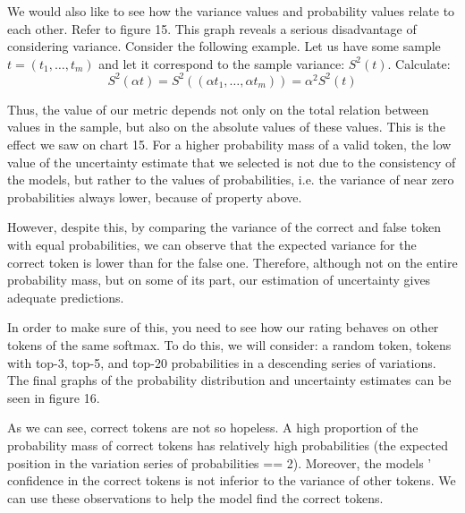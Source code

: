 \documentclass[a4paper,14pt]{extarticle}
\begin{document}
	We would also like to see how the variance values and probability values relate to each other. Refer to figure 15. This graph reveals a serious disadvantage of considering variance. Consider the following example. Let us have some sample $t = (t_1, \dots, t_m)$ and let it correspond to the sample variance: $S^2 (t)$. Calculate:
	\begin{equation*}
		S^2(\alpha t) = S^2((\alpha t_1, \dots, \alpha t_m)) = \alpha^2 S^2(t)
	\end{equation*}
	
	Thus, the value of our metric depends not only on the total relation between values in the sample, but also on the absolute values of these values. This is the effect we saw on chart 15. For a higher probability mass of a valid token, the low value of the uncertainty estimate that we selected is not due to the consistency of the models, but rather to the values of probabilities, i.e. the variance of near zero probabilities always lower, because of property above.

	However, despite this, by comparing the variance of the correct and false token with equal probabilities, we can observe that the expected variance for the correct token is lower than for the false one. Therefore, although not on the entire probability mass, but on some of its part, our estimation of uncertainty gives adequate predictions.

	In order to make sure of this, you need to see how our rating behaves on other tokens of the same softmax. To do this, we will consider: a random token, tokens with top-3, top-5, and top-20 probabilities in a descending series of variations. The final graphs of the probability distribution and uncertainty estimates can be seen in figure 16.
	
	As we can see, correct tokens are not so hopeless. A high proportion of the probability mass of correct tokens has relatively high probabilities (the expected position in the variation series of probabilities == 2). Moreover, the models ' confidence in the correct tokens is not inferior to the variance of other tokens. We can use these observations to help the model find the correct tokens.
	
	\begin{figure}[H]
	\end{figure}
	
\end{document}
